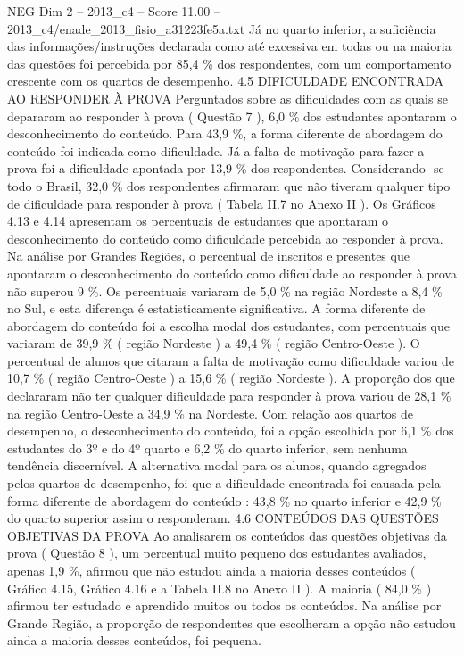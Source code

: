 \begin{textsample}{NEG Dim 2 – 2013\_c4 – Score 11.00 – 2013\_c4/enade\_2013\_fisio\_a31223fe5a.txt}
Já no quarto inferior, a suficiência das informações/instruções declarada como até excessiva em todas ou na maioria das questões foi percebida por 85,4 \% dos respondentes, com um comportamento crescente com os quartos de desempenho. 4.5 DIFICULDADE ENCONTRADA AO RESPONDER À PROVA Perguntados sobre as dificuldades com as quais se depararam ao responder à prova ( Questão 7 ), 6,0 \% dos estudantes apontaram o desconhecimento do conteúdo.
Para 43,9 \%, a forma diferente de abordagem do conteúdo foi indicada como dificuldade.
Já a falta de motivação para fazer a prova foi a dificuldade apontada por 13,9 \% dos respondentes.
Considerando -se todo o Brasil, 32,0 \% dos respondentes afirmaram que não tiveram qualquer tipo de dificuldade para responder à prova ( Tabela II.7 no Anexo II ).
Os Gráficos 4.13 e 4.14 apresentam os percentuais de estudantes que apontaram o desconhecimento do conteúdo como dificuldade percebida ao responder à prova.
Na análise por Grandes Regiões, o percentual de inscritos e presentes que apontaram o desconhecimento do conteúdo como dificuldade ao responder à prova não superou 9 \%.
Os percentuais variaram de 5,0 \% na região Nordeste a 8,4 \% no Sul, e esta diferença é estatisticamente significativa.
A forma diferente de abordagem do conteúdo foi a escolha modal dos estudantes, com percentuais que variaram de 39,9 \% ( região Nordeste ) a 49,4 \% ( região Centro-Oeste ).
O percentual de alunos que citaram a falta de motivação como dificuldade variou de 10,7 \% ( região Centro-Oeste ) a 15,6 \% ( região Nordeste ).
A proporção dos que declararam não ter qualquer dificuldade para responder à prova variou de 28,1 \% na região Centro-Oeste a 34,9 \% na Nordeste.
Com relação aos quartos de desempenho, o desconhecimento do conteúdo, foi a opção escolhida por 6,1 \% dos estudantes do 3º e do 4º quarto e 6,2 \% do quarto inferior, sem nenhuma tendência discernível.
A alternativa modal para os alunos, quando agregados pelos quartos de desempenho, foi que a dificuldade encontrada foi causada pela forma diferente de abordagem do conteúdo : 43,8 \% no quarto inferior e 42,9 \% do quarto superior assim o responderam. 4.6 CONTEÚDOS DAS QUESTÕES OBJETIVAS DA PROVA Ao analisarem os conteúdos das questões objetivas da prova ( Questão 8 ), um percentual muito pequeno dos estudantes avaliados, apenas 1,9 \%, afirmou que não estudou ainda a maioria desses conteúdos ( Gráfico 4.15, Gráfico 4.16 e a Tabela II.8 no Anexo II ).
A maioria ( 84,0 \% ) afirmou ter estudado e aprendido muitos ou todos os conteúdos.
Na análise por Grande Região, a proporção de respondentes que escolheram a opção não estudou ainda a maioria desses conteúdos, foi pequena.

\end{textsample}
